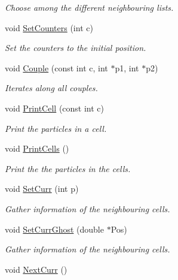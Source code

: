 \begin{DoxyCompactItemize}
\begin{DoxyCompactList}\small\item\em \-Choose among the different neighbouring lists. \end{DoxyCompactList}\item 
void \hyperlink{classDdLinkedList_aadd6f477626e28e8284b9db4649e841d}{\-Set\-Counters} (int c)
\begin{DoxyCompactList}\small\item\em \-Set the counters to the initial position. \end{DoxyCompactList}\item 
void \hyperlink{classDdLinkedList_aabccb7f79ac6e104734750f00fa72b76}{\-Couple} (const int c, int $\ast$p1, int $\ast$p2)
\begin{DoxyCompactList}\small\item\em \-Iterates along all couples. \end{DoxyCompactList}\item 
void \hyperlink{classDdLinkedList_af5188eb0e6caae79f8bf349bf2345cf2}{\-Print\-Cell} (const int c)
\begin{DoxyCompactList}\small\item\em \-Print the particles in a cell. \end{DoxyCompactList}\item 
void \hyperlink{classDdLinkedList_a1132024d8fdd721fd6a36781d4235162}{\-Print\-Cells} ()
\begin{DoxyCompactList}\small\item\em \-Print the the particles in the cells. \end{DoxyCompactList}\item 
void \hyperlink{classDdLinkedList_a74b7b0d716684a7d46993c83795fd9e7}{\-Set\-Curr} (int p)
\begin{DoxyCompactList}\small\item\em \-Gather information of the neighbouring cells. \end{DoxyCompactList}\item 
\hypertarget{classDdLinkedList_acbfe19bc52a783e62b9ed1a4548020be}{void \hyperlink{classDdLinkedList_acbfe19bc52a783e62b9ed1a4548020be}{\-Set\-Curr\-Ghost} (double $\ast$\-Pos)}\label{classDdLinkedList_acbfe19bc52a783e62b9ed1a4548020be}

\begin{DoxyCompactList}\small\item\em \-Gather information of the neighbouring cells. \end{DoxyCompactList}\item 
\hypertarget{classDdLinkedList_a42eeb7049c078ca89057fbc08726eded}{void \hyperlink{classDdLinkedList_a42eeb7049c078ca89057fbc08726eded}{\-Next\-Curr} ()}\label{classDdLinkedList_a42eeb7049c078ca89057fbc08726eded}


\end{DoxyCompactItemize}
